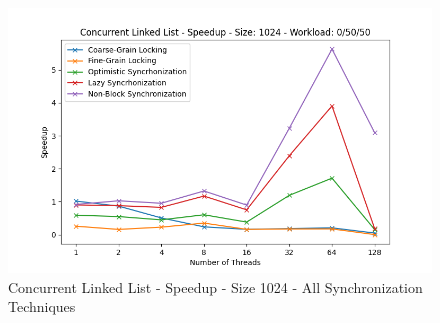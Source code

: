 \documentclass[../final_report.tex]{subfiles}
\begin{document}
\begin{figure}[H]
        \includegraphics[scale=0.4]{outFiles/plots/concurrent_data_structs_all_speedup_1024_0_50_50.png}
    \caption{Concurrent Linked List - Speedup - Size 1024 - All Synchronization Techniques}
    \label{fig:Concurrent Linked List - Speedup - Size 1024 - All Synchronization Techniques}
\end{figure}
\end{document}

